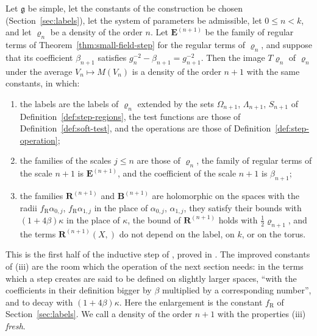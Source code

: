\documentclass[11pt]{preprint}
\makeatletter
\newcommand*{\bigcdot}{}%
\DeclareRobustCommand*{\bigcdot}{%
	\mathbin{\mathpalette\bigcdot@{}}%
}
\newcommand*{\bigcdot@scalefactor}{.7}
\newcommand*{\bigcdot@widthfactor}{1.15}
\newcommand*{\bigcdot@}[2]{%
	\sbox0{$#1\vcenter{}$}%
	\sbox2{$#1\cdot\m@th$}%
	\hbox to \bigcdot@widthfactor\wd2{%
		\hss
		\raise\ht0\hbox{%
			\scalebox{\bigcdot@scalefactor}{%
				\lower\ht0\hbox{$#1\bullet\m@th$}%
			}%
		}%
		\hss
	}%
}
\numberwithin{equation}{section}
\makeatother
\begin{document}
\begin{theorem}\label{thm:step-density}
Let $\mathfrak g$ be simple, let the constants of the construction be chosen (Section~\ref{sec:labels}), let the system of parameters be admissible, let $0 \leqslant n < k$, and let $\varrho_n$ be a density of the order $n$. Let $\mathbf E^{(n+1)}$ be the family of regular terms of Theorem~\ref{thm:small-field-step} for the regular terms of $\varrho_n$, and suppose that its coefficient $\beta_{n+1}$ satisfies $g_n^{-2} - \beta_{n+1} = g_{n+1}^{-2}$. Then the image $T\varrho_n$ of $\varrho_n$ under the average $V_n \mapsto M(V_n)$ is a density of the order $n + 1$ with the same constants, in which:
\begin{enumerate}[label=(\roman*)]
\item the labels are the labels of $\varrho_n$ extended by the sets $\Omega_{n+1}$, $\Lambda_{n+1}$, $S_{n+1}$ of Definition~\ref{def:step-regions}, the test functions are those of Definition~\ref{def:soft-test}, and the operations are those of Definition~\ref{def:step-operation};
\item the families of the scales $j \leqslant n$ are those of $\varrho_n$, the family of regular terms of the scale $n + 1$ is $\mathbf E^{(n+1)}$, and the coefficient of the scale $n + 1$ is $\beta_{n+1}$;
\item the families $\mathbf R^{(n+1)}$ and $\mathbf B^{(n+1)}$ are holomorphic on the spaces with the radii $f_{\mathrm R}\alpha_{0,j}$, $f_{\mathrm R}\alpha_{1,j}$ in the place of $\alpha_{0,j}$, $\alpha_{1,j}$, they satisfy their bounds with $(1 + 4\beta)\kappa$ in the place of $\kappa$, the bound of $\mathbf R^{(n+1)}$ holds with $\frac{1}{2}\varrho_{n+1}$, and the terms $\mathbf R^{(n+1)}(X, \bigcdot)$ do not depend on the label, on $k$, or on the torus.
\end{enumerate}
\end{theorem}

This is the first half of the inductive step of \cite[Theorem~1, p.~262]{BalabanCRE}, proved in \cite[Sect.~3]{BalabanCRE}. The improved constants of (iii) are the room which the operation of the next section needs: in \cite[p.~262]{BalabanCRE} the terms which a step creates are said to be defined on slightly larger spaces, ``with the coefficients in their definition bigger by $\beta$ multiplied by a corresponding number'', and to decay with $(1 + 4\beta)\kappa$. Here the enlargement is the constant $f_{\mathrm R}$ of Section~\ref{sec:labels}. We call a density of the order $n + 1$ with the properties (iii) \emph{fresh}.
\end{document}
